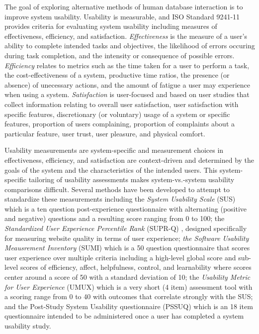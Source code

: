 The goal of exploring alternative methods of human database interaction is to improve system usability. 
Usability is measurable, and ISO Standard 9241-11 provides criteria for evaluating system usability \cite{10.1007/978-3-319-39510-4_25, 10.1016/S0306-4379(00)00015-6, iso-usability} including measures of effectiveness, efficiency, and satisfaction. 
\textit{Effectiveness} is the measure of a user's ability to complete intended tasks and objectives, the likelihood of errors occuring during task completion, and the intensity or consequence of possible errors. 
\textit{Efficiency} relates to metrics such as the time taken for a user to perform a task, the cost-effectiveness of a system, productive time ratios, the presence (or absence) of unecessary actions, and the amount of fatigue a user may experience when using a system. 
\textit{Satisfaction} is user-focused and based on user studies that collect information relating to overall user satisfaction, user satisfaction with specific features, discretionary (or voluntary) usage of a system or specific features, proportion of users complaining, proportion of complaints about a particular feature, user trust, user pleasure, and physical comfort.

Usability measurements are system-specific and measurement choices in effectiveness, efficiency, and satisfaction are context-driven and determined by the goals of the system and the characteristics of the intended users. 
This system-specific tailoring of usability assessments makes system-vs.-system usability comparisons difficult. 
Several methods have been developed to attempt to standardize these measurements including the \emph{System Usability Scale} (SUS) \cite{sus-retrospective} which is a ten question post-experience questionnaire with alternating (positive and negative) questions and a resulting score ranging from 0 to 100; the \emph{Standardized User Experience Percentile Rank} (SUPR-Q) \cite{suprq}, designed specifically for measuring website quality in terms of user experience; \emph{the Software Usability Meausrement Inventory} (SUMI) \cite{sumi} which is a 50 question questionnaire that scores user experience over multiple criteria including a high-level global score and sub-level scores of efficiency, affect, helpfulness, control, and learnability where scores center around a score of 50 with a standard deviation of 10; the \emph{Usability Metric for User Experience} (UMUX) \cite{10.1016/j.intcom.2010.04.004} which is a very short (4 item) assessment tool with a scoring range from 0 to 40 with outcomes that correlate strongly with the SUS; and the Post-Study System Usability questionnaire (PSSUQ) \cite{pssuq} which is an 18 item questionnaire intended to be administered once a user has completed a system usability study.

